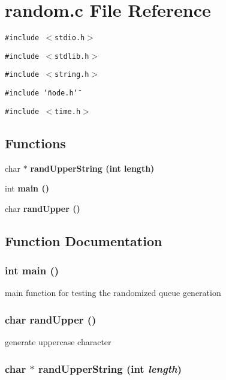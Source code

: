 \section{random.c File Reference}
\label{random_8c}
{\tt \#include $<$stdio.h$>$}\par
{\tt \#include $<$stdlib.h$>$}\par
{\tt \#include $<$string.h$>$}\par
{\tt \#include \char`\"{}node.h\char`\"{}}\par
{\tt \#include $<$time.h$>$}\par
\subsection*{Functions}
\begin{CompactItemize}
\item 
char $\ast$ \bf{rand\-Upper\-String} (int length)
\item 
int \bf{main} ()
\item 
char \bf{rand\-Upper} ()
\end{CompactItemize}


\subsection{Function Documentation}
\subsubsection{\setlength{\rightskip}{0pt plus 5cm}int main ()}\label{random_8c_e66f6b31b5ad750f1fe042a706a4e3d4}


main function for testing the randomized queue generation 
\subsubsection{\setlength{\rightskip}{0pt plus 5cm}char rand\-Upper ()}\label{random_8c_5fe82ac9fd267030625c517a9fc03a4c}


generate uppercase character 
\subsubsection{\setlength{\rightskip}{0pt plus 5cm}char $\ast$ rand\-Upper\-String (int {\em length})}\label{random_8c_51e49b1e175ac51052ea5dd330cbea98}


